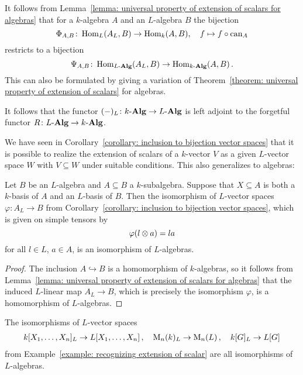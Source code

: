 \begin{remark}
  It follows from Lemma~\ref{lemma: universal property of extension of scalars for algebras} that for a $k$-algebra $A$ and an $L$-algebra $B$ the bijection
  \[
            \Phi_{A,B}
    \colon  \operatorname{Hom}_L(A_L, B)
    \to     \operatorname{Hom}_k(A, B),
    \quad   f
    \mapsto f \circ \operatorname{can}_A
  \]
  restricts to a bijection
  \[
            \Psi_{A,B}
    \colon  \operatorname{Hom}_{L\text{-}\mathbf{Alg}}(A_L, B)
    \to     \operatorname{Hom}_{k\text{-}\mathbf{Alg}}(A, B) \,.
  \]
  This can also be formulated by giving a variation of Theorem~\ref{theorem: universal property of extension of scalars} for algebras.
  
  It follows that the functor $(-)_L \colon k\text{-}\mathbf{Alg} \to L\text{-}\mathbf{Alg}$ is left adjoint to the forgetful functor $R \colon L\text{-}\mathbf{Alg} \to k\text{-}\mathbf{Alg}$.
\end{remark}


\begin{fluff}
  We have seen in Corollary~\ref{corollary: inclusion to bijection vector spaces} that it is possible to realize the extension of scalars of a $k$-vector $V$ as a given $L$-vector space $W$ with $V \subseteq W$ under suitable conditions.
  This also generalizes to algebras:
\end{fluff}


\begin{corollary}
\label{corollary: inclusion to bijection algebras}
  Let $B$ be an $L$-algebra and $A \subseteq B$ a $k$-subalgebra.
  Suppose that $X \subseteq A$ is both a $k$-basis of $A$ and an $L$-basis of $B$.
  Then the isomorphism of $L$-vector spaces $\varphi \colon A_L \to B$ from Corollary~\ref{corollary: inclusion to bijection vector spaces}, which is given on simple tensors by
  \[
      \varphi(l \mathbin{\otimes} a)
    = l a
  \]
  for all $l \in L$, $a \in A$, is an isomorphism of $L$-algebras.
\end{corollary}
\begin{proof}
  The inclusion $A \hookrightarrow B$ is a homomorphism of $k$-algebras, so it follows from Lemma~\ref{lemma: universal property of extension of scalars for algebras} that the induced $L$-linear map $A_L \to B$, which is precisely the isomorphism $\varphi$, is a homomorphism of $L$-algebras.
\end{proof}


\begin{example}
  The isomorphisms of $L$-vector spaces
  \begin{gather*}
    k[X_1, \dotsc, X_n]_L \to L[X_1, \dotsc, X_n] \,,
    \quad
    \operatorname{M}_n(k)_L \to \operatorname{M}_n(L) \,,
    \quad
    k[G]_L \to L[G]
  \end{gather*}
  from Example~\ref{example: recognizing extension of scalar} are all isomorphisms of $L$-algebras.
\end{example}


